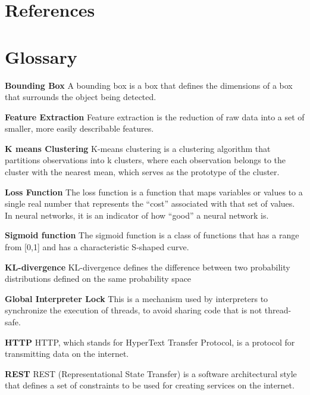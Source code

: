 \documentclass[12pt,letterpaper]{article}
\begin{document}

\section*{References}
\label{sec:refer}


\pagebreak



\section*{Glossary}
\label{sec:glossary}

\textbf{Bounding Box} A bounding box is a box that defines the dimensions of a box that surrounds the object being detected.

\noindent \textbf{Feature Extraction} Feature extraction is the reduction of raw data into a set of smaller, more easily describable features.

\noindent \textbf{K means Clustering} K-means clustering is a clustering algorithm that partitions observations into k clusters, where each observation belongs to the cluster with the nearest mean, which serves as the prototype of the cluster.

\noindent \textbf{Loss Function} The loss function is a function that maps variables or values to a single real number that represents the “cost” associated with that set of values. In neural networks, it is an indicator of how “good” a neural network is.

\noindent \textbf{Sigmoid function} The sigmoid function is a class of functions that has a range from [0,1] and has a characteristic S-shaped curve.

\noindent \textbf{KL-divergence} KL-divergence defines the difference between two probability distributions defined on the same probability space

\noindent \textbf{Global Interpreter Lock} This is a mechanism used by interpreters to synchronize the execution of threads, to avoid sharing code that is not thread-safe.

\noindent \textbf{HTTP} HTTP, which stands for HyperText Transfer Protocol, is a protocol for transmitting data on the internet.

\noindent \textbf{REST} REST (Representational State Transfer) is a software architectural style that defines a set of constraints to be used for creating services on the internet.

\pagebreak
\end{document}
